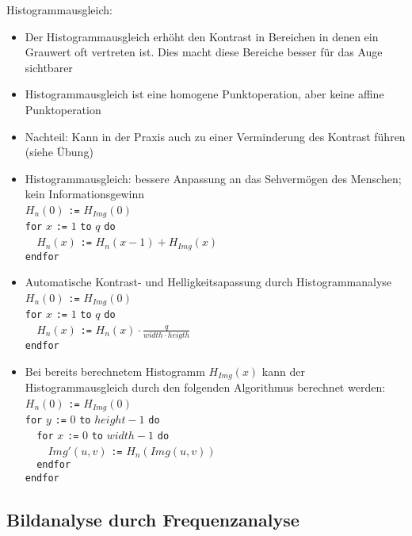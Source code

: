 Histogrammausgleich:
\begin{itemize}
	\item Der Histogrammausgleich erhöht den Kontrast in Bereichen in denen ein Grauwert oft vertreten ist. Dies macht diese Bereiche besser für das Auge sichtbarer
	\item Histogrammausgleich ist eine homogene Punktoperation, aber keine affine Punktoperation
	\item Nachteil: Kann in der Praxis auch zu einer Verminderung des Kontrast führen (siehe Übung)
\end{itemize}
\begin{itemize}
\item Histogrammausgleich: bessere Anpassung an das Sehvermögen des Menschen; kein Informationsgewinn \\
$H_n(0)$ \verb|:=| $H_{Img}(0)$ \\
\verb|for| $x$ \verb|:=| $1$ \verb|to| $q$ \verb|do| \\
\verb|  |$H_n(x)$ \verb|:=| $H_n(x-1) + H_{Img}(x)$ \\
\verb|endfor|
\item Automatische Kontrast- und Helligkeitsapassung durch Histogrammanalyse \\
$H_n(0)$ \verb|:=| $H_{Img}(0)$ \\
\verb|for| $x$ \verb|:=| $1$ \verb|to| $q$ \verb|do| \\
\verb|  |$H_n(x)$ \verb|:=| $H_n(x) \cdot \frac{q}{width \cdot heigth}$ \\
\verb|endfor|
\item Bei bereits berechnetem Histogramm $H_{Img}(x)$ kann der Histogrammausgleich durch den folgenden Algorithmus berechnet werden: \\
$H_n(0)$ \verb|:=| $H_{Img}(0)$ \\
\verb|for| $y$ \verb|:=| $0$ \verb|to| $height - 1$ \verb|do| \\
\verb|  for| $x$ \verb|:=| $0$ \verb|to| $width-1$ \verb|do| \\
\verb|    | $Img'(u,v)$ \verb|:=| $H_n(Img(u,v))$ \\
\verb|  endfor| \\
\verb|endfor|
\end{itemize}



\subsection{Bildanalyse durch Frequenzanalyse}

